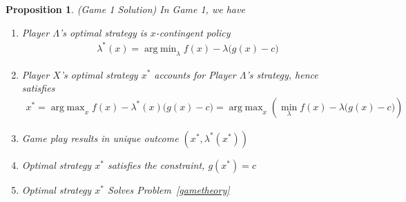 \documentclass[12pt]{book}
\numberwithin{equation}{section} %
\theoremstyle{plain}
\newtheorem{prop}[thm]{Proposition}
\theoremstyle{definition}
\theoremstyle{remark}
\DeclareMathOperator*{\argmin}{arg\;min}
\DeclareMathOperator*{\argmax}{arg\;max}
\begin{document}
\begin{prop}
\label{prop:game1}
\emph{(Game 1 Solution)}
In Game 1, we have
\begin{enumerate}[label=\emph{(\roman*)}]
  \item Player $\Lambda$'s optimal strategy is $x$-contingent policy
    \begin{align*}
      \lambda^*(x) = \argmin_\lambda f(x)-\lambda\big(g(x)-c\big)
    \end{align*}
  \item
    Player $X$'s optimal strategy $x^*$ accounts for Player $\Lambda$'s
    strategy, hence satisfies
    \begin{align}
      x^*
      = \argmax_x f(x)-\lambda^*(x)\big(g(x)-c\big)
      = \argmax_x \left(
      \min_\lambda f(x)-\lambda\big(g(x)-c\big)
      \right)
      \label{gametheoryxopt}
    \end{align}
  \item Game play results in unique outcome $(x^*,\lambda^*(x^*))$
  \item Optimal strategy $x^*$ satisfies the constraint, $g(x^*)=c$
  \item Optimal strategy $x^*$ Solves Problem~\ref{gametheory}
\end{enumerate}
\end{prop}
\clearpage
\end{document}
